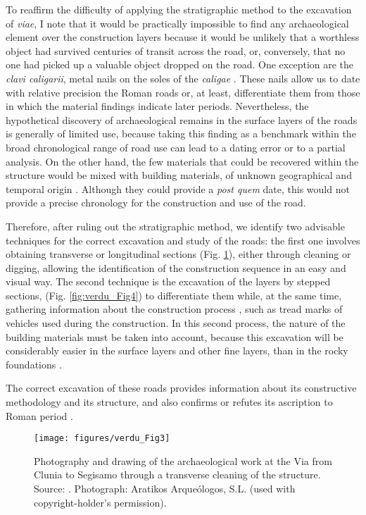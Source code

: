 	To reaffirm the difficulty of applying the stratigraphic method to the excavation of \textit{viae}, I note that it would be practically impossible to find any archaeological element over the construction layers because it would be unlikely that a worthless object had survived centuries of transit across the road, or, conversely, that no one had picked up a valuable object dropped on the road. One exception are the \textit{clavi caligarii}, metal nails on the soles of the \textit{caligae} \parencite{Rodriguez_2012}. These nails allow us to date with relative precision the Roman roads or, at least, differentiate them from those in which the material findings indicate later periods. Nevertheless, the hypothetical discovery of archaeological remains in the surface layers of the roads is generally of limited use, because taking this finding as a benchmark within the broad chronological range of road use can lead to a dating error or to a partial analysis. On the other hand, the few materials that could be recovered within the structure would be mixed with building materials, of unknown geographical and temporal origin \parencite[36]{Moreno_2009}. Although they could provide a \textit{post quem} date, this would not provide a precise chronology for the construction and use of the road.
	
	Therefore, after ruling out the stratigraphic method, we identify two advisable techniques for the correct excavation and study of the roads: the first one involves obtaining transverse or longitudinal sections (Fig. \ref{fig:verdu_Fig3}), either through cleaning or digging, allowing the identification of the construction sequence in an easy and visual way. The second technique is the excavation of the layers by stepped sections, (Fig. \ref{fig:verdu_Fig4}) to differentiate them while, at the same time, gathering information about the construction process \parencite[49]{Palomino_2010}, such as tread marks of vehicles used during the construction. In this second process, the nature of the building materials must be taken into account, because this excavation will be considerably easier in the surface layers and other fine layers, than in the rocky foundations \parencite[35]{Moreno_2009}.
	
	The correct excavation of these roads provides information about its constructive methodology and its structure, and also confirms or refutes its ascription to Roman period \parencites[33]{Moreno_2009}[72]{Palomino_2010}. 
	
		\begin{figure}[!htb]
			\texttt{[image: figures/verdu\_Fig3]}
			\centering
			\caption{Photography and drawing of the archaeological work at the Via from Clunia to Segisamo through a transverse cleaning of the structure. Source: \textcite[56]{Palomino_2010}. Photograph: Aratikos Arqueólogos, S.L. (used with copyright-holder’s permission).}
			\label{fig:verdu_Fig3}
		\end{figure}
		

